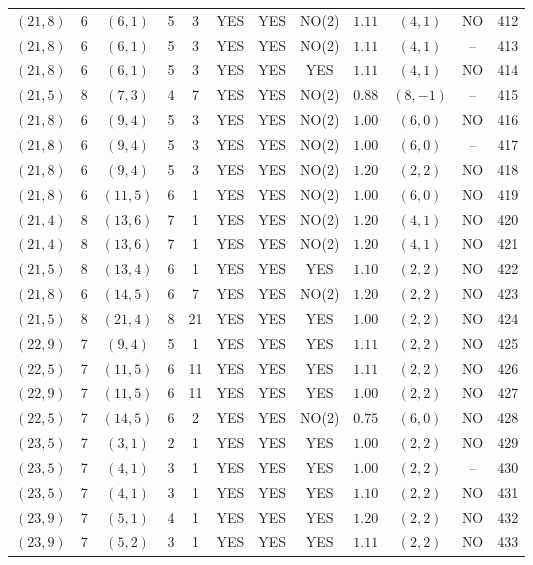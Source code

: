\begin{longtable}{|c|c|c|c|c|c|c|c|c|c|c|c|}
$(21,8)$ & 6 & $(6,1)$ & 5 & 3 & YES & YES & NO(2) & $1.11$ & $(4,1)$ & NO & 412\\
$(21,8)$ & 6 & $(6,1)$ & 5 & 3 & YES & YES & NO(2) & $1.11$ & $(4,1)$ & -- & 413\\
$(21,8)$ & 6 & $(6,1)$ & 5 & 3 & YES & YES & YES & $1.11$ & $(4,1)$ & NO & 414\\
$(21,5)$ & 8 & $(7,3)$ & 4 & 7 & YES & YES & NO(2) & $0.88$ & $(8,-1)$ & -- & 415\\
$(21,8)$ & 6 & $(9,4)$ & 5 & 3 & YES & YES & NO(2) & $1.00$ & $(6,0)$ & NO & 416\\
$(21,8)$ & 6 & $(9,4)$ & 5 & 3 & YES & YES & NO(2) & $1.00$ & $(6,0)$ & -- & 417\\
$(21,8)$ & 6 & $(9,4)$ & 5 & 3 & YES & YES & NO(2) & $1.20$ & $(2,2)$ & NO & 418\\
$(21,8)$ & 6 & $(11,5)$ & 6 & 1 & YES & YES & NO(2) & $1.00$ & $(6,0)$ & NO & 419\\
$(21,4)$ & 8 & $(13,6)$ & 7 & 1 & YES & YES & NO(2) & $1.20$ & $(4,1)$ & NO & 420\\
$(21,4)$ & 8 & $(13,6)$ & 7 & 1 & YES & YES & NO(2) & $1.20$ & $(4,1)$ & NO & 421\\
$(21,5)$ & 8 & $(13,4)$ & 6 & 1 & YES & YES & YES & $1.10$ & $(2,2)$ & NO & 422\\
$(21,8)$ & 6 & $(14,5)$ & 6 & 7 & YES & YES & NO(2) & $1.20$ & $(2,2)$ & NO & 423\\
$(21,5)$ & 8 & $(21,4)$ & 8 & 21 & YES & YES & YES & $1.00$ & $(2,2)$ & NO & 424\\
$(22,9)$ & 7 & $(9,4)$ & 5 & 1 & YES & YES & YES & $1.11$ & $(2,2)$ & NO & 425\\
$(22,5)$ & 7 & $(11,5)$ & 6 & 11 & YES & YES & YES & $1.11$ & $(2,2)$ & NO & 426\\
$(22,9)$ & 7 & $(11,5)$ & 6 & 11 & YES & YES & YES & $1.00$ & $(2,2)$ & NO & 427\\
$(22,5)$ & 7 & $(14,5)$ & 6 & 2 & YES & YES & NO(2) & $0.75$ & $(6,0)$ & NO & 428\\
$(23,5)$ & 7 & $(3,1)$ & 2 & 1 & YES & YES & YES & $1.00$ & $(2,2)$ & NO & 429\\
$(23,5)$ & 7 & $(4,1)$ & 3 & 1 & YES & YES & YES & $1.00$ & $(2,2)$ & -- & 430\\
$(23,5)$ & 7 & $(4,1)$ & 3 & 1 & YES & YES & YES & $1.10$ & $(2,2)$ & NO & 431\\
$(23,9)$ & 7 & $(5,1)$ & 4 & 1 & YES & YES & YES & $1.20$ & $(2,2)$ & NO & 432\\
$(23,9)$ & 7 & $(5,2)$ & 3 & 1 & YES & YES & YES & $1.11$ & $(2,2)$ & NO & 433\\

\end{longtable}
